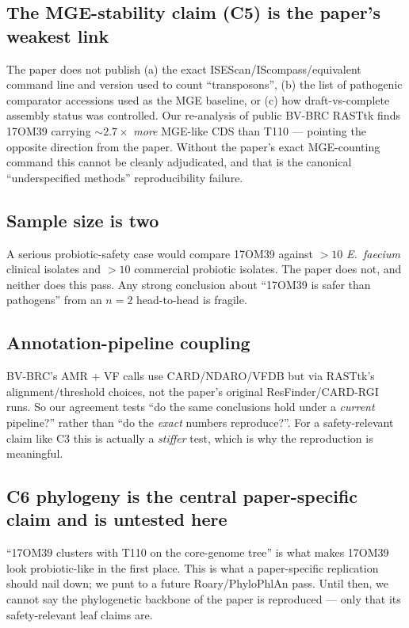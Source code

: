 \documentclass[11pt,a4paper]{article}
\begin{document}
\subsection{The MGE-stability claim (C5) is the paper's weakest link}
The paper does not publish (a) the exact ISEScan/IScompass/equivalent command line and version used to count ``transposons'', (b) the list of pathogenic comparator accessions used as the MGE baseline, or (c) how draft-vs-complete assembly status was controlled. Our re-analysis of public BV-BRC RASTtk finds 17OM39 carrying $\sim 2.7\times$ \emph{more} MGE-like CDS than T110 --- pointing the opposite direction from the paper. Without the paper's exact MGE-counting command this cannot be cleanly adjudicated, and that is the canonical ``underspecified methods'' reproducibility failure.

\subsection{Sample size is two}
A serious probiotic-safety case would compare 17OM39 against $>10$ \emph{E.\ faecium} clinical isolates and $>10$ commercial probiotic isolates. The paper does not, and neither does this pass. Any strong conclusion about ``17OM39 is safer than pathogens'' from an $n=2$ head-to-head is fragile.

\subsection{Annotation-pipeline coupling}
BV-BRC's AMR + VF calls use CARD/NDARO/VFDB but via RASTtk's alignment/threshold choices, not the paper's original ResFinder/CARD-RGI runs. So our agreement tests ``do the same conclusions hold under a \emph{current} pipeline?'' rather than ``do the \emph{exact} numbers reproduce?''. For a safety-relevant claim like C3 this is actually a \emph{stiffer} test, which is why the reproduction is meaningful.

\subsection{C6 phylogeny is the central paper-specific claim and is untested here}
``17OM39 clusters with T110 on the core-genome tree'' is what makes 17OM39 look probiotic-like in the first place. This is what a paper-specific replication should nail down; we punt to a future Roary/PhyloPhlAn pass. Until then, we cannot say the phylogenetic backbone of the paper is reproduced --- only that its safety-relevant leaf claims are.
\end{document}
